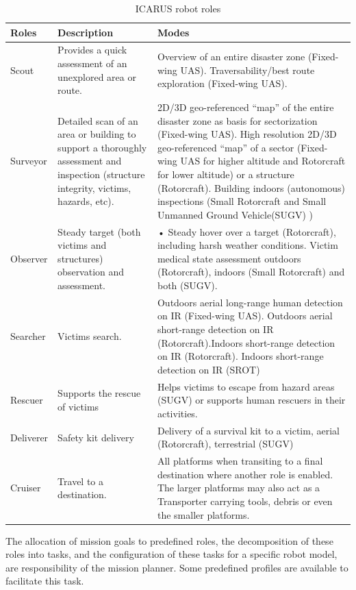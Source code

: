 \documentclass{article}
\begin{document}
\begin{table}[h!]
\centering
\begin{tabular}{| l | p{5cm} | p{7cm} | }
\hline
Roles &	Description	& Modes \\ \hline
Scout &	Provides a quick assessment of an unexplored area or route. &
Overview of an entire disaster zone (Fixed-wing UAS).
Traversability/best route exploration (Fixed-wing UAS). \\ \hline
Surveyor &	Detailed scan of an area or building to support a thoroughly assessment and inspection (structure integrity, victims, hazards, etc). & 2D/3D geo-referenced “map” of the entire disaster zone as basis for sectorization (Fixed-wing UAS).
High resolution 2D/3D geo-referenced “map” of a sector (Fixed-wing UAS for higher altitude and Rotorcraft for lower altitude) or a structure (Rotorcraft).
Building indoors (autonomous) inspections (Small Rotorcraft and Small Unmanned Ground Vehicle(SUGV) ) \\ \hline
Observer &	Steady target (both victims and structures) observation and assessment. & •	Steady hover over a target (Rotorcraft), including harsh weather conditions. Victim medical state assessment outdoors (Rotorcraft), indoors (Small Rotorcraft) and both (SUGV). \\ \hline
Searcher &	Victims search. & Outdoors aerial long-range human detection on IR (Fixed-wing UAS). Outdoors aerial short-range detection on IR (Rotorcraft).Indoors short-range detection on IR (Rotorcraft). Indoors short-range detection on IR (SROT)
\\ \hline
Rescuer & Supports the rescue of victims & Helps victims to escape from hazard areas (SUGV) or supports human rescuers in their activities.  \\ \hline
Deliverer &	Safety kit delivery	& Delivery of a survival kit to a victim, aerial (Rotorcraft), terrestrial (SUGV) \\ \hline
Cruiser &	Travel to a destination.  & All platforms when transiting to a final destination where another role is enabled.
The larger platforms may also act as a Transporter carrying tools, debris or even the smaller platforms.\\ \hline
\end{tabular}
\caption{ICARUS robot roles}
\label{table:robotroles}
\end{table}
The allocation of mission goals to predefined roles, the decomposition of these roles into tasks, and the configuration of these tasks for a specific robot model, are responsibility of the mission planner. Some predefined profiles are available to facilitate this task.
\end{document}
